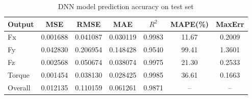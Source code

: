 \begin{table}[htbp]
  \centering
  \caption{DNN model prediction accuracy on test set}
  \label{tab:dnn_accuracy}
  \begin{tabular}{lcccccc}
    \toprule
    Output & MSE & RMSE & MAE & $R^2$ & MAPE(\%) & MaxErr \\
    \midrule
    Fx & 0.001688 & 0.041087 & 0.030119 & 0.9983 & 11.67 & 0.2009 \\
    Fy & 0.042830 & 0.206954 & 0.148428 & 0.9540 & 99.41 & 1.3601 \\
    Fz & 0.002568 & 0.050674 & 0.038074 & 0.9975 & 21.30 & 0.2533 \\
    Torque & 0.001454 & 0.038130 & 0.028425 & 0.9985 & 36.61 & 0.1663 \\
    \midrule
    Overall & 0.012135 & 0.110159 & 0.061261 & 0.9871 & -- & -- \\
    \bottomrule
  \end{tabular}
\end{table}